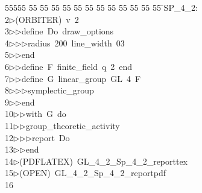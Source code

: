 %
%
\begin{tabbing}
55555 \= 55 \= 55 \= 55 \= 55 \= 55 \= 55 \= 55 \= 55 \= 55 \= 55 \= 55 \= 55 \= \>SP\_4\_2:\\[0pt]
2\>$\triangleright$\>(ORBITER)\ v\ 2\ \\[0pt]
3\>$\triangleright$\>$\triangleright$\>define\ Do\ draw\_options\ \\[0pt]
4\>$\triangleright$\>$\triangleright$\>$\triangleright$\>radius\ 200\ line\_width\ 03\ \\[0pt]
5\>$\triangleright$\>$\triangleright$\>end\ \\[0pt]
6\>$\triangleright$\>$\triangleright$\>define\ F\ finite\_field\ q\ 2\ end\ \\[0pt]
7\>$\triangleright$\>$\triangleright$\>define\ G\ linear\_group\ GL\ 4\ F\ \\[0pt]
8\>$\triangleright$\>$\triangleright$\>$\triangleright$\>symplectic\_group\ \\[0pt]
9\>$\triangleright$\>$\triangleright$\>end\ \\[0pt]
10\>$\triangleright$\>$\triangleright$\>with\ G\ do\ \\[0pt]
11\>$\triangleright$\>$\triangleright$\>group\_theoretic\_activity\ \\[0pt]
12\>$\triangleright$\>$\triangleright$\>$\triangleright$\>report\ Do\ \\[0pt]
13\>$\triangleright$\>$\triangleright$\>end\\[0pt]
14\>$\triangleright$\>(PDFLATEX)\ GL\_4\_2\_Sp\_4\_2\_reporttex\\[0pt]
15\>$\triangleright$\>(OPEN)\ GL\_4\_2\_Sp\_4\_2\_reportpdf\\[0pt]
16\>\end{tabbing}
